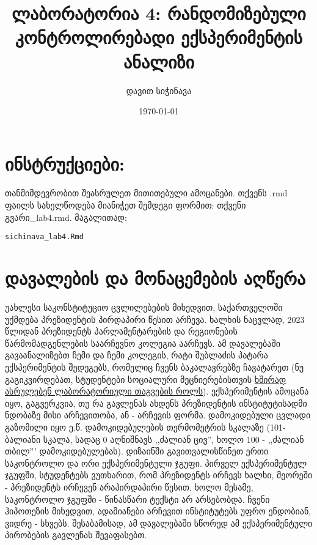 \documentclass{article}\usepackage[]{graphicx}\usepackage[]{color}
\title{ლაბორატორია 4: რანდომიზებული კონტროლირებადი ექსპერიმენტის ანალიზი}
\author{დავით სიჭინავა}
\date{\today}
\makeatletter
\newcommand{\hlstd}[1]{\textcolor[rgb]{0.345,0.345,0.345}{#1}}%
\newenvironment{kframe}{%
 \def\at@end@of@kframe{}%
 \ifinner\ifhmode%
  \def\at@end@of@kframe{\end{minipage}}%
  \begin{minipage}{\columnwidth}%
 \fi\fi%
 \def\FrameCommand##1{\hskip\@totalleftmargin \hskip-\fboxsep
 \colorbox{shadecolor}{##1}\hskip-\fboxsep
     \hskip-\linewidth \hskip-\@totalleftmargin \hskip\columnwidth}%
 \MakeFramed {\advance\hsize-\width
   \@totalleftmargin\z@ \linewidth\hsize
   \@setminipage}}%
 {\par\unskip\endMakeFramed%
 \at@end@of@kframe}
\newenvironment{knitrout}{}{} %
\makeatother
\begin{document}
\maketitle

\section*{ინსტრუქციები:}

\paragraph{}
თანმიმდევრობით შეასრულეთ მითითებული ამოცანები. თქვენს .rmd ფაილს სახელწოდება მიანიჭეთ შემდეგი ფორმით: თქვენი გვარი\_lab4.rmd. მაგალითად:

\begin{knitrout}
\color{fgcolor}\begin{kframe}
\begin{alltt}
\hlstd{sichinava_lab4.Rmd}
\end{alltt}
\end{kframe}
\end{knitrout}

\section*{დავალების და მონაცემების აღწერა}

უახლესი საკონსტიტუციო ცვლილებების მიხედვით, საქართველოში უქმდება პრეზიდენტის პირდაპირი წესით არჩევა. ხალხის ნაცვლად, 2023 წლიდან პრეზიდენტს პარლამენტარების და რეგიონების წარმომადგენლების საარჩევნო კოლეგია აარჩევს. ამ დავალებაში გავაანალიზებთ ჩემი და ჩემი კოლეგის, რატი შუბლაძის პატარა ექსპერიმენტის შედეგებს, რომელიც ჩვენს ბაკალავრებზე ჩავატარეთ (ნუ გაგიკვირდებათ, სტუდენტები სოციალური მეცნიერებისთვის \href{https://www.ipr.northwestern.edu/publications/docs/workingpapers/2009/IPR-WP-09-05.pdf}{ხშირად ასრულებენ ლაბორატორიული თაგვების როლს}). ექსპერიმენტის ამოცანა იყო, გაგვერკვია, თუ რა გავლენას ახდენს პრეზიდენტის ინსტიტუტისადმი ნდობაზე მისი არჩევითობა, ან - არჩევის ფორმა. დამოკიდებული ცვლადი გაზომილი იყო ე.წ. დამოკიდებულების თერმომეტრის სკალაზე (101-ბალიანი სკალა, სადაც 0 აღნიშნავს ,,ძალიან ცივ'', ხოლო 100 - ,,ძალიან თბილ''' დამოკიდებულებას). დიზაინში გავითვალისწინეთ ერთი საკონტროლო და ორი ექსპერიმენტული ჯგუფი. პირველ ექსპერიმენტულ ჯგუფში, სტუდენტებს ვუთხარით, რომ პრეზიდენტს ირჩევს ხალხი, მეორეში - პრეზიდენტს ირჩევენ არაპირდაპირი წესით, ხოლო მესამე, საკონტროლო ჯგუფში - წინასწარი ტექსტი არ არსებობდა. ჩვენი ჰიპოთეზის მიხედვით, ადამიანები არჩევით ინსტიტუტებს უფრო ენდობიან, ვიდრე - სხვებს. შესაბამისად, ამ დავალებაში სწორედ ამ ექსპერიმენტული პირობების გავლენას შევაფასებთ.
\end{document}
